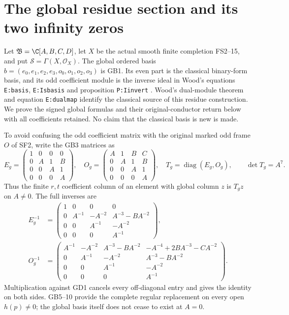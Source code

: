 \section{The global residue section and its two infinity zeros}
Let $\mathfrak B=\C[A,B,C,D]$, let $X$ be the actual smooth
finite completion FS2--15, and put $\mathscr S=\Gamma(X,\mathcal O_X)$.
The global ordered basis $b=(e_0,e_1,e_2,e_3,o_0,o_1,o_2,o_3)$
is GB1. Its even part is the classical binary-form basis, and
its odd coefficient module is the inverse ideal in Wood's
equations \texttt{E:basis}, \texttt{E:Isbasis} and proposition
\texttt{P:Iinvert} \cite{WoodBinary}. Wood's dual-module theorem
and equation \texttt{E:dualmap} identify the classical source of
this residue construction. We prove the signed global formulas
and their original-conductor return below with all coefficients
retained. No claim that the classical basis is new is made.

To avoid confusing the odd coefficient matrix with the original
marked odd frame $O$ of SF2, write the GB3 matrices as
\begin{equation}
 E_g=\begin{pmatrix}1&0&0&0\\0&A&1&B\\0&0&A&1\\0&0&0&A\end{pmatrix},\quad
 O_g=\begin{pmatrix}A&1&B&C\\0&A&1&B\\0&0&A&1\\0&0&0&A\end{pmatrix},\quad
 T_g=\operatorname{diag}(E_g,O_g),\qquad\det T_g=A^7.
 \tag{GD1}
\end{equation}
Thus the finite $r,t$ coefficient column of an element with
global column $z$ is $T_gz$ on $A\ne0$. The full inverses are
\begin{equation}
\begin{aligned}
 E_g^{-1}&=\begin{pmatrix}1&0&0&0\\
 0&A^{-1}&-A^{-2}&A^{-3}-BA^{-2}\\
 0&0&A^{-1}&-A^{-2}\\0&0&0&A^{-1}\end{pmatrix},\\
 O_g^{-1}&=\begin{pmatrix}
 A^{-1}&-A^{-2}&A^{-3}-BA^{-2}&-A^{-4}+2BA^{-3}-CA^{-2}\\
 0&A^{-1}&-A^{-2}&A^{-3}-BA^{-2}\\
 0&0&A^{-1}&-A^{-2}\\0&0&0&A^{-1}
 \end{pmatrix}.
\end{aligned}\tag{GD2}
\end{equation}
Multiplication against GD1 cancels every off-diagonal entry
and gives the identity on both sides. GB5--10 provide the
complete regular replacement on every open $h(p)\ne0$;
the global basis itself does not cease to exist at $A=0$.

